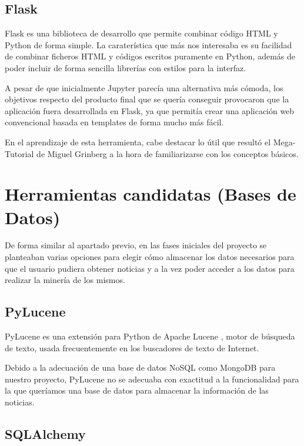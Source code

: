 \subsection{Flask}

Flask es una biblioteca de desarrollo \cite{Grinberg:2014:FWD:2621997} que permite combinar código HTML y Python de forma simple. La caraterística que más nos interesaba es su facilidad de combinar ficheros HTML y códigos escritos puramente en Python, además de poder incluir de forma sencilla librerías con estilos para la interfaz.

A pesar de que inicialmente Jupyter parecía una alternativa más cómoda, los objetivos respecto del producto final que se quería conseguir provocaron que la aplicación fuera desarrollada en Flask, ya que permitía crear una aplicación web convencional basada en templates de forma mucho más fácil.

En el aprendizaje de esta herramienta, cabe destacar lo útil que resultó el Mega-Tutorial de Miguel Grinberg \cite{flaskmegatutorial} a la hora de familiarizarse con los conceptos básicos.


\bigskip

\section{Herramientas candidatas (Bases de Datos)}
De forma similar al apartado previo, en las fases iniciales del proyecto se planteaban varias opciones para elegir c\'omo almacenar los datos necesarios para que el usuario pudiera obtener noticias y a la vez poder acceder a los datos para realizar la minería de los mismos.

\subsection{PyLucene}

PyLucene \cite{pylucene:homepage} es una extensión para Python de Apache Lucene \cite{wiki:lucene}, motor de búsqueda de texto, usada frecuentemente en los buscadores de texto de Internet.

Debido a la adecuación de una base de datos NoSQL como MongoDB para nuestro proyecto, PyLucene no se adecuaba con exactitud a la funcionalidad para la que queríamos una base de datos para almacenar la información de las noticias.

\subsection{SQLAlchemy}

